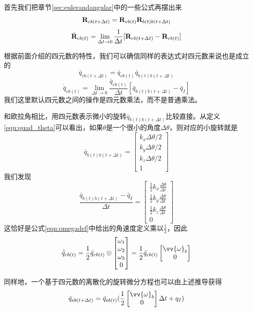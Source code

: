 \documentclass[11pt]{article}
\begin{document}
首先我们把章节\ref{sec:eulerandangular}中的一些公式再摆出来
\begin{equation*}
{\bf R}_{eb(t+\Delta t)} = {\bf R}_{eb(t)}{\bf R}_{b(t)b(t+\Delta t)}
\end{equation*}
$$
\dot{{\bf R}}_{eb(t)} = \lim_{\Delta t \to 0}\frac{1}{\Delta t}[{\bf R}_{eb(t+\Delta t)} - {\bf R}_{eb(t)}]
$$

根据前面介绍的四元数的特性，我们可以确信同样的表达式对四元数来说也是成立的
\begin{equation*}
\bar{q}_{eb(t+\Delta t)} = \bar{q}_{eb(t)}\bar{q}_{b(t)b(t+\Delta t)}
\end{equation*}
$$
\dot{\bar{q}}_{eb(t)} = \lim_{\Delta t \to 0}\frac{\bar{q}_{eb(t)}}{\Delta t}[\bar{q}_{b(t)b(t+\Delta t)} - \bar{q}_I]
$$
我们这里默认四元数之间的操作是四元数乘法，而不是普通乘法。

和欧拉角相比，用四元数表示微小的旋转$\bar{q}_{b(t)b(t+\Delta t)}$比较直接。从定义\ref{equ:quad_theta}可以看出，如果$\theta$是一个很小的角度$\Delta \theta$，则对应的小旋转就是
$$
\bar{q}_{b(t)b(t+\Delta t)} =
	\begin{bmatrix} 
        k_x \Delta\theta/2\\
        k_y \Delta\theta/2\\
        k_z \Delta\theta/2\\
      	1
	\end{bmatrix}
$$
我们发现
$$
\frac{\bar{q}_{b(t)b(t+\Delta t)} - \bar{q}_I}{\Delta t} =
	\begin{bmatrix} 
        \frac{1}{2}k_x \frac{\Delta\theta}{\Delta t}\\
        \frac{1}{2}k_y \frac{\Delta\theta}{\Delta t}\\
        \frac{1}{2}k_z \frac{\Delta\theta}{\Delta t}\\
      	0
	\end{bmatrix}
$$
这恰好是公式\ref{eqn:omegadef}中给出的角速度定义乘以$\frac{1}{2}$，因此
$$
\dot{\bar{q}}_{eb(t)} = \frac{1}{2}\bar{q}_{eb(t)}\otimes
	\begin{bmatrix} 
        \omega_1\\ 
        \omega_2\\ 
        \omega_3\\
      	0
	\end{bmatrix} = 
	\frac{1}{2}\bar{q}_{eb(t)}
	\begin{bmatrix} 
        \vv{\omega}_b\\
      	0
	\end{bmatrix}
$$

同样地，一个基于四元数的离散化的旋转微分方程也可以由上述推导获得
\begin{equation}\label{eqn:discreterdot_quat}
\bar{q}_{eb(t+\Delta t)} = \bar{q}_{eb(t)}(
	\frac{1}{2}	
	\begin{bmatrix} 
        \vv{\omega}_b\\
      	0
	\end{bmatrix}\Delta t + q_I
	)
\end{equation}
\end{document}
